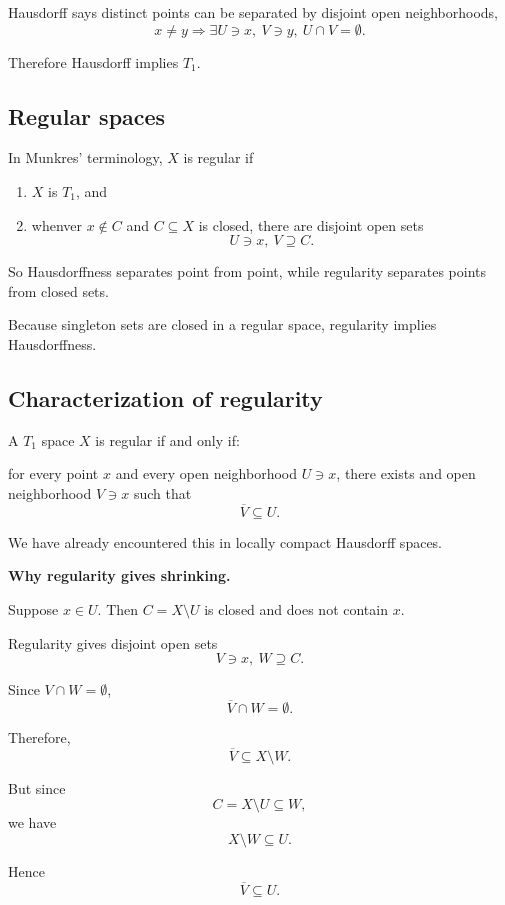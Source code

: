 \documentclass[11pt]{article}
\begin{document}
Hausdorff says distinct points can be 
separated by disjoint open neighborhoods, 
\[
    x \neq y \Rightarrow \exists U \ni x, 
    \ V \ni y, \ U \cap V = \emptyset. 
\]

Therefore Hausdorff implies $T_1$. 

\subsection{Regular spaces}

In Munkres' terminology, $X$ is regular if 
\begin{enumerate}
    \item $X$ is $T_1$, and 
    \item whenver $x \not\in C$ and $C \subseteq X$ is 
    closed, there are disjoint open sets 
    \[
        U \ni x, \ V \supseteq C. 
    \]
\end{enumerate}

So Hausdorffness separates point from point, while 
regularity separates points from closed sets. 

Because singleton sets are closed in a regular 
space, regularity implies Hausdorffness. 

\subsection{Characterization of regularity}

A $T_1$ space $X$ is regular if and only if: 

for every point $x$ and every open 
neighborhood $U \ni x$, there exists and 
open neighborhood $V \ni x$ such that 
\[
    \overline V \subseteq U. 
\]

We have already encountered this in 
locally compact Hausdorff spaces. 

\textbf{Why regularity gives shrinking.}

Suppose $x \in U$. 
Then $C = X \setminus U$ is closed and does not 
contain $x$. 

Regularity gives disjoint open sets 
\[
    V \ni x, \ W \supseteq C. 
\]

Since $V \cap W = \emptyset$, 
\[
    \overline V \cap W = \emptyset. 
\]

Therefore, 
\[
    \overline V \subseteq X \setminus W. 
\]

But since 
\[
    C = X \setminus U \subseteq W, 
\]
we have 
\[
    X \setminus W \subseteq U. 
\]

Hence 
\[
    \overline V \subseteq U. 
\]
\end{document}
